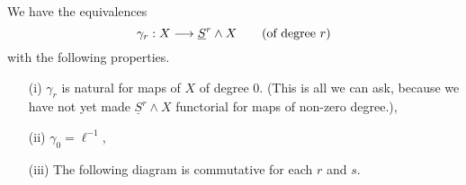 \documentclass[../main]{subfiles}
\begin{document}
\begin{proposition}
\label{prop:p3c04.9}
We have the equivalences $$\gamma_r : X \overset{}{\longrightarrow} \underline S^r \wedge X \qquad \text {(of degree } r\text{)}$$ with the following properties. 

\begin{enumerate}
    \item[(i)] $\gamma_r$ is natural for maps of $X$ of degree $0$. (This is all we can ask, because we have not yet made $\underline S^r \wedge X$ functorial for maps of non-zero degree.),
    \item[(ii)] $\gamma_0 = \ell^{-1}$,
    \item[(iii)] The following diagram is commutative for each $r$ and $s$.
    \begin{center}
    \end{center}
\end{enumerate}
\end{proposition}
\end{document}
